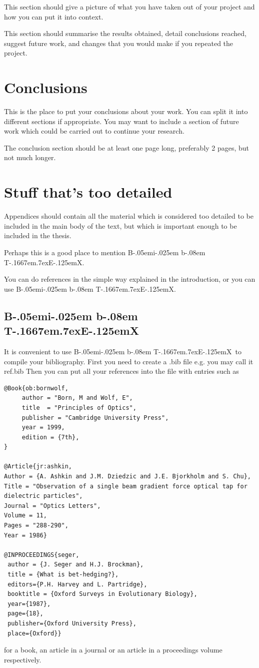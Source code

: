 \documentclass[12pt,a4paper]{report}
\def\BibTeX{{\rm B\kern-.05em{\sc i\kern-.025em b}\kern-.08em
    T\kern-.1667em\lower.7ex\hbox{E}\kern-.125emX}}
\begin{document}
This section should give a picture of what you have taken out of your
project and how you can put it into context.

This section should summarise the results obtained, detail conclusions
reached, suggest future work, and changes that you would make if you
repeated the project.

\chapter{Conclusions}

This is the place to put your conclusions about your work. You can
split it into different sections if appropriate. You may want to include
a section of future work which could be carried out to continue your
research.

The conclusion section should be at least one page long, preferably 2
pages, but not much longer.

\appendix

\chapter{Stuff that's too detailed}

Appendices should contain all the material which is considered too
detailed to be included in the main body of the text, but which is
important enough to be included in the thesis.

Perhaps this is a good place to mention \BibTeX.

You can do references in the simple way explained in the introduction,
or you can use \BibTeX.


\section{\BibTeX}
\label{sec:bibtex}

It is convenient to use \BibTeX\ to compile your bibliography.  First
you need to create a .bib file e.g.  you may call it ref.bib Then you
can put all your references into the file with entries such as
\begin{verbatim}
@Book{ob:bornwolf,
     author = "Born, M and Wolf, E",
     title  = "Principles of Optics",
     publisher = "Cambridge University Press",
     year = 1999,
     edition = {7th},
}

@Article{jr:ashkin,
Author = {A. Ashkin and J.M. Dziedzic and J.E. Bjorkholm and S. Chu},
Title = "Observation of a single beam gradient force optical tap for 
dielectric particles",
Journal = "Optics Letters",
Volume = 11,
Pages = "288-290",
Year = 1986}

@INPROCEEDINGS{seger,
 author = {J. Seger and H.J. Brockman},
 title = {What is bet-hedging?},
 editors={P.H. Harvey and L. Partridge},
 booktitle = {Oxford Surveys in Evolutionary Biology},
 year={1987},
 page={18},
 publisher={Oxford University Press},
 place={Oxford}}
\end{verbatim}
for a book, an article in a journal or an article in a proceedings volume
respectively.
\end{document}
